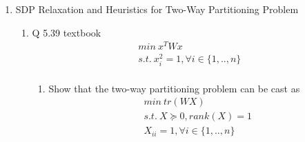 \documentclass[12pt,letter]{article}
\begin{document}


\begin{enumerate}
  \item SDP Relaxation and Heuristics for Two-Way Partitioning Problem
  \begin{enumerate}
  \item Q 5.39 textbook\\
    \begin{align*}
      min\ x^T W x\\
      s.t.\ x_i^2 = 1, \forall i \in \{1,..,n\}\\
    \end{align*}
    \begin{enumerate}
    \item
    Show that the two-way partitioning problem can be cast as
    \begin{align*}
      min\ tr(WX)\\
      s.t.\ X \succeq 0, rank(X)=1\\
      X_{ii}=1, \forall i \in \{1,..,n\}
    \end{align*}


\end{enumerate}
\end{enumerate}
\end{enumerate}
\end{document}
